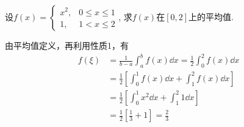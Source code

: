    




























































































\begin{example}
  设$f(x)=\begin{cases}
      x^2,& 0\le x\le 1\\
      1,& 1<x\le 2
  \end{cases}$,  求$f(x)$在$[0,2]$上的平均值.
\end{example}


\begin{solution}
由平均值定义，再利用性质1，有    
\[\begin{split}
    f(\xi)&=\frac{1}{b-a}\int^b_a f(x)\dd x=\frac{1}{2}\int^2_0 f(x)\dd x\\
    &=\frac{1}{2}\left[\int^1_0 f(x)\dd x+\int^2_1 f(x)\dd x\right]\\
    &=\frac{1}{2}\left[\int^1_0 x^2\dd x+\int^2_1 1\dd x\right]\\
    &=\frac{1}{2}\left[\frac{1}{3}+1\right]=\frac{2}{3}
\end{split}\]
\end{solution}

